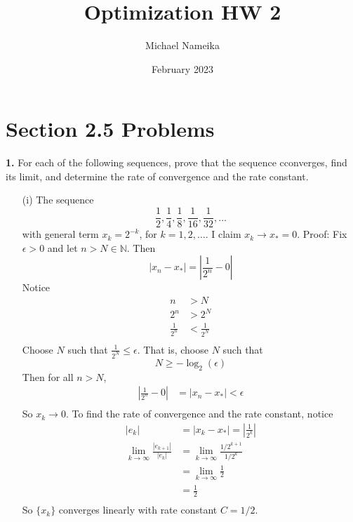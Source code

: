 \documentclass{article}
\title{Optimization HW 2}
\author{Michael Nameika}
\date{February 2023}
\begin{document}
\maketitle

\section*{Section 2.5 Problems}
\textbf{1.} For each of the following sequences, prove that the sequence cconverges, find its limit, and determine the rate of convergence and the rate constant.
\begin{itemize}
    \item[(i)] The sequence
    \[\frac{1}{2}, \frac{1}{4}, \frac{1}{8}, \frac{1}{16}, \frac{1}{32}, \ldots\]
    with general term $x_k = 2^{-k}$, for $k = 1, 2, \dots$.
    \newline\newline
    I claim $x_k \to x_* =0$.
    \newline
    Proof: Fix $\epsilon > 0$ and let $n > N \in \mathbb{N}$. Then
    \[|x_n - x_*| = \left|\frac{1}{2^n} - 0\right|\]
    Notice
    \begin{align*}
        n &> N \\
        2^n &> 2^N \\
        \frac{1}{2^n} &< \frac{1}{2^N} \\
    \end{align*}
    Choose $N$ such that $\frac{1}{2^N} \leq \epsilon$. That is, choose $N$ such that
    \[N \geq -\log_2(\epsilon)\]
    Then for all $n > N$,
    \begin{align*}
        \left|\frac{1}{2^n} - 0\right| &= |x_n - x_*| < \epsilon \\
    \end{align*}
    So $x_k \to 0$.
    \newline\newline
    To find the rate of convergence and the rate constant, notice
    \begin{align*}
        |e_k| &= |x_k - x_*| = \left|\frac{1}{2^k}\right| \\
        \lim_{k\to \infty} \frac{|e_{k+1}|}{|e_k|} &= \lim_{k \to \infty} \frac{1/2^{k+1}}{1/2^k} \\
        &= \lim_{k \to \infty} \frac{1}{2} \\
        &= \frac{1}{2} \\
    \end{align*}
    So $\{x_k\}$ converges linearly with rate constant $C = 1/2$. 


\end{itemize}
\end{document}
